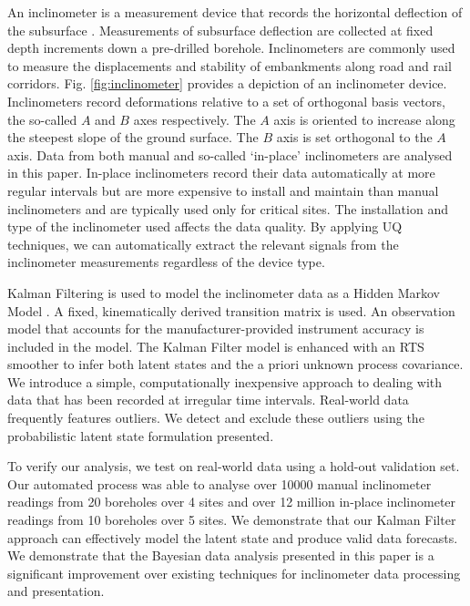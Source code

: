 \documentclass[pamm,a4paper,fleqn]{w-art}
\begin{document}
An inclinometer is a measurement device that records the horizontal deflection of the subsurface \cite{machan2008use}. Measurements of subsurface deflection are collected at fixed depth increments down a pre-drilled borehole. Inclinometers are commonly used to measure the displacements and stability of embankments along road and rail corridors. Fig. \ref{fig:inclinometer} provides a depiction of an inclinometer device. Inclinometers record deformations relative to a set of orthogonal basis vectors, the so-called $A$ and $B$ axes respectively. The $A$ axis is oriented to increase along the steepest slope of the ground surface. The $B$ axis is set orthogonal to the $A$ axis. Data from both manual and so-called `in-place' inclinometers are analysed in this paper. In-place inclinometers record their data automatically at more regular intervals but are more expensive to install and maintain than manual inclinometers and are typically used only for critical sites. The installation and type of the inclinometer used affects the data quality. By applying UQ techniques, we can automatically extract the relevant signals from the inclinometer measurements regardless of the device type.

Kalman Filtering is used to model the inclinometer data as a Hidden Markov Model \cite{russell2010artificial}. A fixed, kinematically derived transition matrix is used. An observation model that accounts for the manufacturer-provided instrument accuracy is included in the model. The Kalman Filter model is enhanced with an RTS smoother \cite{rauch1965maximum, sarkka2008unscented} to infer both latent states and the a priori unknown process covariance. We introduce a simple, computationally inexpensive approach to dealing with data that has been recorded at irregular time intervals. Real-world data frequently features outliers. We detect and exclude these outliers using the probabilistic latent state formulation presented.

To verify our analysis, we test on real-world data using a hold-out validation set. Our automated process was able to analyse over 10000 manual inclinometer readings from 20 boreholes over 4 sites and over 12 million in-place inclinometer readings from 10 boreholes over 5 sites. We demonstrate that our Kalman Filter approach can effectively model the latent state and produce valid data forecasts. We demonstrate that the Bayesian data analysis presented in this paper is a significant improvement over existing techniques for inclinometer data processing and presentation.
\end{document}
